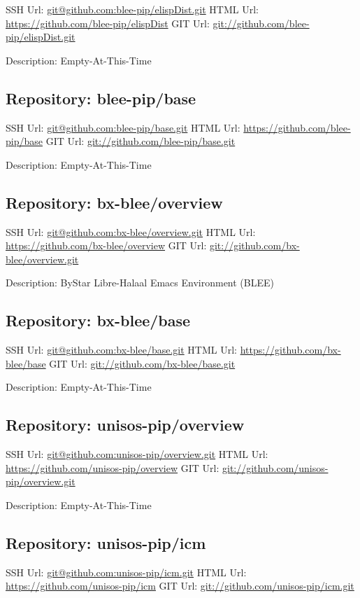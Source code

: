 SSH Url:  \url{git@github.com:blee-pip/elispDist.git}
HTML Url: \url{https://github.com/blee-pip/elispDist}
GIT Url:  \url{git://github.com/blee-pip/elispDist.git}

Description: Empty-At-This-Time

\subsection{Repository: blee-pip/base}

SSH Url:  \url{git@github.com:blee-pip/base.git}
HTML Url: \url{https://github.com/blee-pip/base}
GIT Url:  \url{git://github.com/blee-pip/base.git}

Description: Empty-At-This-Time

\subsection{Repository: bx-blee/overview}

SSH Url:  \url{git@github.com:bx-blee/overview.git}
HTML Url: \url{https://github.com/bx-blee/overview}
GIT Url:  \url{git://github.com/bx-blee/overview.git}

Description: ByStar Libre-Halaal Emacs Environment (BLEE)

\subsection{Repository: bx-blee/base}

SSH Url:  \url{git@github.com:bx-blee/base.git}
HTML Url: \url{https://github.com/bx-blee/base}
GIT Url:  \url{git://github.com/bx-blee/base.git}

Description: Empty-At-This-Time

\subsection{Repository: unisos-pip/overview}

SSH Url:  \url{git@github.com:unisos-pip/overview.git}
HTML Url: \url{https://github.com/unisos-pip/overview}
GIT Url:  \url{git://github.com/unisos-pip/overview.git}

Description: Empty-At-This-Time

\subsection{Repository: unisos-pip/icm}

SSH Url:  \url{git@github.com:unisos-pip/icm.git}
HTML Url: \url{https://github.com/unisos-pip/icm}
GIT Url:  \url{git://github.com/unisos-pip/icm.git}

